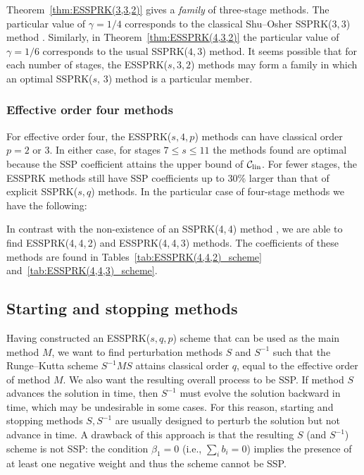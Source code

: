 Theorem~\ref{thm:ESSPRK(3,3,2)} gives a \emph{family} of three-stage 
methods. 
The particular value of $\gamma = 1/4$ corresponds to the classical
Shu--Osher SSPRK($3,3$) method \cite{Gottlieb/Shu:1998}.
Similarly, in Theorem~\ref{thm:ESSPRK(4,3,2)} the particular value of 
$\gamma = 1/6$ corresponds to the usual SSPRK($4,3$) method.
It seems possible that for each number of stages, the 
ESSPRK($s, 3, 2$) methods may form a family in which an optimal 
SSPRK($s$, $3$) method is a particular member. 

\subsubsection{Effective order four methods}\label{subsubsec:4th_ESSPRK}
For effective order four, the ESSPRK($s,4,p$) methods can have
classical order $p=2$ or $3$.
In either case, for stages $7 \le s \le 11$ the methods found are
optimal because the SSP coefficient attains the upper bound of
$\mathcal{C}_{\text{lin}}$.
For fewer stages, the ESSPRK methods still have SSP coefficients up to
30\% larger than that of explicit SSPRK($s,q$) methods.
In the particular case of four-stage methods we have the following:%
\begin{remark}
	In contrast with the non-existence of an SSPRK(4,\,4) method 
	\cite{Gottlieb/Shu:1998,Ruuth2002}, 
	we are able to find ESSPRK(4,\,4,\,2) and ESSPRK(4,\,4,\,3) methods.
	The coefficients of these methods are found in
	Tables~\ref{tab:ESSPRK(4,4,2)_scheme}
	and~\ref{tab:ESSPRK(4,4,3)_scheme}.
\end{remark}

\subsection{Starting and stopping methods}\label{subsec:starting_stopping}
Having constructed an ESSPRK($s,q,p$) scheme that can be used as the main 
method $M$, we want to find perturbation methods $S$ and $S^{-1}$ such that the 
Runge--Kutta scheme $S^{-1}MS$ attains classical order $q$, equal to the 
effective order of method $M$.
We also want the resulting overall process to be SSP.
If method $S$ advances the solution in time, then $S^{-1}$ must evolve the 
solution backward in time, which may be undesirable in some cases. 
For this reason, starting and stopping methods $S, S^{-1}$ are usually 
designed to perturb the solution but not advance in time. 
A drawback of this approach is that the resulting $S$ (and $S^{-1}$) scheme 
is not SSP:
the condition $\beta_1 = 0$ (i.e., $\sum_i b_i = 0$) implies the presence of
at least one negative
weight and thus the scheme cannot be SSP.


